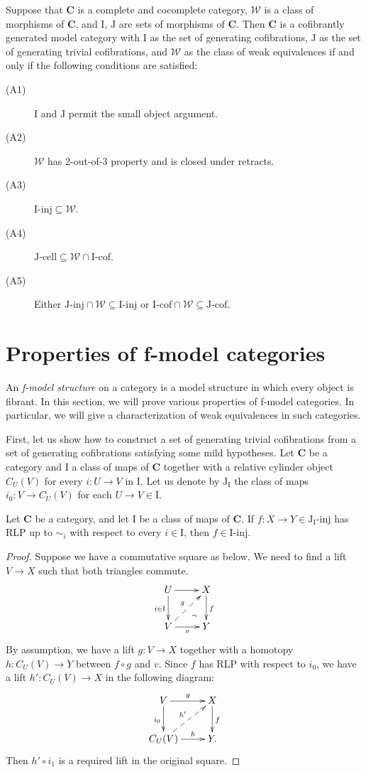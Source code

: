 \documentclass{amsart}
\theoremstyle{definition}
\newcommand{\we}{\mathcal{W}}
\newcommand{\cat}[1]{\mathbf{#1}}
\newcommand{\C}{\cat{C}}
\newcommand{\I}{\mathrm{I}}
\newcommand{\J}{\mathrm{J}}
\newcommand{\class}[2]{#1\text{-}\mathrm{#2}}
\newcommand{\Iinj}[1][\I]{\class{#1}{inj}}
\newcommand{\Icell}[1][\I]{\class{#1}{cell}}
\newcommand{\Icof}[1][\I]{\class{#1}{cof}}
\newcommand{\Jinj}[1][]{\Iinj[\J#1]}
\newcommand{\Jcell}[1][]{\Icell[\J#1]}
\newcommand{\Jcof}[1][]{\Icof[\J#1]}
\newcommand{\cyli}{i}
\begin{document}
\begin{prop}
Suppose that $\C$ is a complete and cocomplete category, $\we$ is a class of morphisms of $\C$, and $\I$, $\J$ are sets of morphisms of $\C$.
Then $\C$ is a cofibrantly generated model category with $\I$ as the set of generating cofibrations,
$\J$ as the set of generating trivial cofibrations, and $\we$ as the class of weak equivalences if and only if the following conditions are satisfied:
\begin{description}
\item[(A1)] $\I$ and $\J$ permit the small object argument.
\item[(A2)] $\we$ has 2-out-of-3 property and is closed under retracts.
\item[(A3)] $\Iinj \subseteq \we$.
\item[(A4)] $\Jcell \subseteq \we \cap \Icof$.
\item[(A5)] Either $\Jinj \cap \we \subseteq \Iinj$ or $\Icof \cap \we \subseteq \Jcof$.
\end{description}
\end{prop}

\section{Properties of f-model categories}

An \emph{f-model structure} on a category is a model structure in which every object is fibrant.
In this section, we will prove various properties of f-model categories.
In particular, we will give a characterization of weak equivalences in such categories.

First, let us show how to construct a set of generating trivial cofibrations from a set of generating cofibrations satisfying some mild hypotheses.
Let $\C$ be a category and $\I$ a class of maps of $\C$ together with a relative cylinder object $C_U(V)$ for every $i : U \to V$ in $\I$.
Let us denote by $\J_\I$ the class of maps $\cyli_0 : V \to C_U(V)$ for each $U \to V \in \I$.

\begin{prop}
Let $\C$ be a category, and let $\I$ be a class of maps of $\C$.
If $f : X \to Y \in \Jinj[_\I]$ has RLP up to $\sim_i$ with respect to every $i \in \I$, then $f \in \Iinj$.
\end{prop}
\begin{proof}
Suppose we have a commutative square as below.
We need to find a lift $V \to X$ such that both triangles commute.
\[ \xymatrix{ U \ar[d]_{i \in \I} \ar[r] \ar@{}[dr]|(.7){\sim} & X \ar[d]^f \\
              V \ar[r]_v \ar@{-->}[ur]^g                       & Y
            } \]
By assumption, we have a lift $g : V \to X$ together with
a homotopy $h : C_U(V) \to Y$ between $f \circ g$ and $v$.
Since $f$ has RLP with respect to $\cyli_0$, we have a lift $h' : C_U(V) \to X$ in the following diagram:
\[ \xymatrix{ V \ar[r]^g \ar[d]_{\cyli_0}         & X \ar[d]^f \\
              C_U(V) \ar[r]^-h \ar@{-->}[ur]^{h'} & Y.
            } \]
Then $h' \circ \cyli_1$ is a required lift in the original square.
\end{proof}
\end{document}

